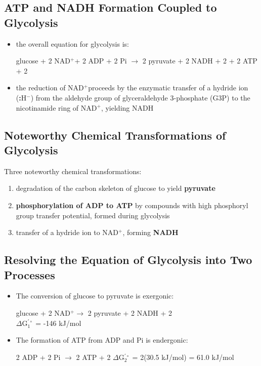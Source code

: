 \documentclass[10pt]{article}
\newcommand{\water}{\text{H$_2$O}}
\newcommand{\proton}{\text{H$^+$}}
\newcommand{\pc}{$^+$}
\newcommand{\nc}{$^-$}
\begin{document}
\subsection*{ATP and NADH Formation Coupled to Glycolysis}
\begin{itemize}
	\item the overall equation for glycolysis is:
	\begin{center} 
        glucose + 2 NAD\pc + 2 ADP + 2 Pi $\rightarrow$ 2 pyruvate + 2 NADH + 2 \proton + 2 ATP + 2 \water
    \end{center}
    \item the reduction of NAD\pc proceeds by the enzymatic transfer of a hydride ion (\textbf{:}H\nc) from the aldehyde group of glyceraldehyde 3-phosphate (G3P) to the nicotinamide ring of NAD\pc, yielding NADH
\end{itemize}

\subsection*{Noteworthy Chemical Transformations of Glycolysis}
Three noteworthy chemical transformations:
\begin{enumerate}
    \item degradation of the carbon skeleton of glucose to yield \textbf{pyruvate}
    \item \textbf{phosphorylation of ADP to ATP} by compounds with high phosphoryl group transfer potential, formed during glycolysis
    \item transfer of a hydride ion to NAD\pc, forming \textbf{NADH}
\end{enumerate}

\subsection*{Resolving the Equation of Glycolysis into Two Processes}
\begin{itemize}
	\item The conversion of glucose to pyruvate is exergonic:
	\begin{center}
        glucose + 2 NAD\pc $\rightarrow$ 2 pyruvate + 2 NADH + 2 \proton\\
        $\Delta$G$^{'\circ}_1$ = -146 kJ/mol
    \end{center}
    \item The formation of ATP from ADP and Pi is endergonic:
	\begin{center}
        2 ADP + 2 Pi $\rightarrow$ 2 ATP + 2 \water
        $\Delta$G$^{'\circ}_2$ = 2(30.5 kJ/mol) = 61.0 kJ/mol
    \end{center}
\end{itemize}
\end{document}
